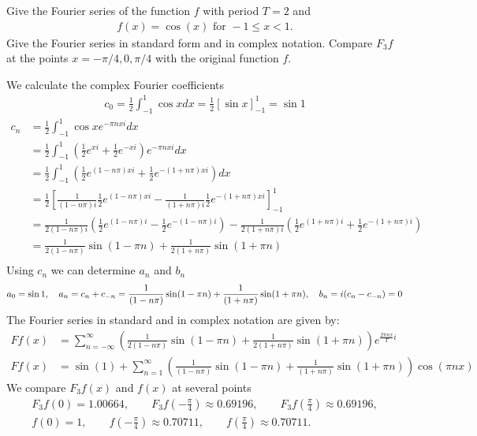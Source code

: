 \documentclass[11pt]{article}
\begin{document}
\begin{exercise}
    Give the Fourier series of the function $f$ with period $T = 2$ and 
    \begin{gather*}
        f(x) = \cos(x) \text{ for } -1 \leq x < 1.
    \end{gather*}
    Give the Fourier series in standard form and in complex notation. 
    Compare $F_3 f$ at the points $x = -\pi/4, 0, \pi/4$ with the original function $f$.
\end{exercise}
\begin{solution}    
We calculate the complex Fourier coefficients 
\begin{align*}
    c_0 = \frac 1 2 \int_{-1}^1 \cos x dx = \frac 1 2 [\sin x]_{-1}^1 = \sin 1
\end{align*}
\begin{align*}
    c_n &= \frac 1 2 \int_{-1}^1 \cos x e^{-\pi n x i} dx\\
    &= \frac 1 2 \int_{-1}^1 \left(\frac 1 2 e^{x i} + \frac 1 2 e^{-x i} \right) e^{-\pi n x i} dx\\
    &= \frac 1 2 \int_{-1}^1 \left(\frac 1 2 e^{(1-n\pi)x i} + \frac 1 2 e^{-(1+n\pi)x i} \right) dx\\
    &= \frac 1 2\left[\frac{1}{(1-n\pi) i}\frac 1 2 e^{(1-n\pi)x i} - \frac{1}{(1+n\pi) i}\frac 1 2 e^{-(1+n\pi)x i} \right]_{-1}^1\\
    &= \frac{1}{2(1-n\pi) i}\left( \frac 1 2 e^{(1-n\pi)i}- \frac 1 2 e^{-(1-n\pi) i}\right) - \frac{1}{2(1+n\pi) i}\left( \frac 1 2 e^{(1+n\pi)i}+ \frac 1 2 e^{-(1+n\pi) i}\right)\\
    &= \frac{1}{2(1-n\pi)}\sin(1-\pi n) + \frac{1}{2(1+n\pi)}\sin(1+\pi n)\\
\end{align*}
Using $c_n$ we can determine $a_n$ and $b_n$
$$
    a_0 = \sin 1,\quad a_n = c_n + c_{-n} = \frac{1}{(1-n\pi)}\sin(1-\pi n) + \frac{1}{(1+n\pi)}\sin(1+\pi n)\\, \quad b_n = i(c_n - c_{-n}) = 0
$$
The Fourier series in standard and in complex notation are given by:
\begin{align*}
    F f(x)&=\sum_{n=-\infty}^{\infty} \left(\frac{1}{2(1-n\pi)}\sin(1-\pi n) + \frac{1}{2(1+n\pi)}\sin(1+\pi n)\right) e^{\frac{2 \pi n x}{T} i}
    \\
    F f(x)&=\sin(1)+\sum_{n=1}^{\infty} \left(  \frac{1}{(1-n\pi) }\sin(1-\pi n) + \frac{1}{(1+n\pi)}\sin(1+\pi n) \right) \cos \left(\pi n x\right)
\end{align*}
We compare $F_3f(x)$ and $f(x)$ at several points 
\begin{gather*}
    F_3f(0) = 1.00664,\qquad 
    F_3f\left(-\frac{\pi}{4}\right) \approx 0.69196,\qquad 
    F_3f\left(\frac{\pi}{4}\right) \approx 0.69196,
    \\
    f(0) = 1,\qquad 
    f\left(-\frac{\pi}{4}\right) \approx 0.70711,\qquad
    f\left(\frac{\pi}{4}\right) \approx 0.70711.
\end{gather*}

\end{solution}
\end{document}
